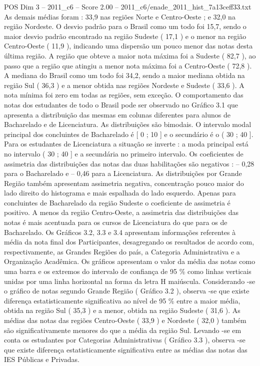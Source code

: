 \begin{textsample}{POS Dim 3 – 2011\_c6 – Score 2.00 – 2011\_c6/enade\_2011\_hist\_7a13ceff33.txt}
As demais médias foram : 33,9 nas regiões Norte e Centro-Oeste ; e 32,0 na região Nordeste.
O desvio padrão para o Brasil como um todo foi 15,7, sendo o maior desvio padrão encontrado na região Sudeste ( 17,1 ) e o menor na região Centro-Oeste ( 11,9 ), indicando uma dispersão um pouco menor das notas desta última região.
A região que obteve a maior nota máxima foi a Sudeste ( 82,7 ), ao passo que a região que atingiu a menor nota máxima foi a Centro-Oeste ( 72,8 ).
A mediana do Brasil como um todo foi 34,2, sendo a maior mediana obtida na região Sul ( 36,3 ) e a menor obtida nas regiões Nordeste e Sudeste ( 33,6 ).
A nota mínima foi zero em todas as regiões, sem exceção.
O comportamento das notas dos estudantes de todo o Brasil pode ser observado no Gráfico 3.1 que apresenta a distribuição das mesmas em colunas diferentes para alunos de Bacharelado e de Licenciatura.
As distribuições são bimodais.
O intervalo modal principal dos concluintes de Bacharelado é [ 0 ; 10 ] e o secundário é o ( 30 ; 40 ].
Para os estudantes de Licenciatura a situação se inverte : a moda principal está no intervalo ( 30 ; 40 ] e a secundária no primeiro intervalo.
Os coeficientes de assimetria das distribuições das notas das duas habilitações são negativos : – 0,28 para o Bacharelado e – 0,46 para a Licenciatura.
As distribuições por Grande Região também apresentam assimetria negativa, concentração pouco maior do lado direito do histograma e mais espalhada do lado esquerdo.
Apenas para concluintes de Bacharelado da região Sudeste o coeficiente de assimetria é positivo.
A menos da região Centro-Oeste, a assimetria das distribuições das notas é mais acentuada para os cursos de Licenciatura do que para os de Bacharelado.
Os Gráficos 3.2, 3.3 e 3.4 apresentam informações referentes à média da nota final dos Participantes, desagregando os resultados de acordo com, respectivamente, as Grandes Regiões do país, a Categoria Administrativa e a Organização Acadêmica.
Os gráficos apresentam o valor da média das notas como uma barra e os extremos do intervalo de confiança de 95 \% como linhas verticais unidas por uma linha horizontal na forma da letra H maiúscula.
Considerando -se o gráfico de notas segundo Grande Região ( Gráfico 3.2 ), observa -se que existe diferença estatisticamente significativa ao nível de 95 \% entre a maior média, obtida na região Sul ( 35,3 ) e a menor, obtida na região Sudeste ( 31,6 ).
As médias das notas das regiões Centro-Oeste ( 33,9 ) e Nordeste ( 32,0 ) também são significativamente menores do que a média da região Sul.
Levando -se em conta os estudantes por Categorias Administrativas ( Gráfico 3.3 ), observa -se que existe diferença estatisticamente significativa entre as médias das notas das IES Públicas e Privadas.

\end{textsample}
